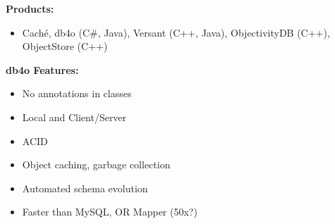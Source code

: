 \begin{breakbox}
\textbf{Products:}
\begin{itemize}
	\item Caché, db4o (C\#, Java), Versant (C++, Java), ObjectivityDB (C++), ObjectStore (C++)
\end{itemize}
\end{breakbox}

\begin{breakbox}
\textbf{db4o Features:}
\begin{itemize}
	\item No annotations in classes
	\item Local and Client/Server
	\item ACID
	\item Object caching, garbage collection
	\item Automated schema evolution
	\item Faster than MySQL, OR Mapper (50x?)
\end{itemize}
\end{breakbox}
